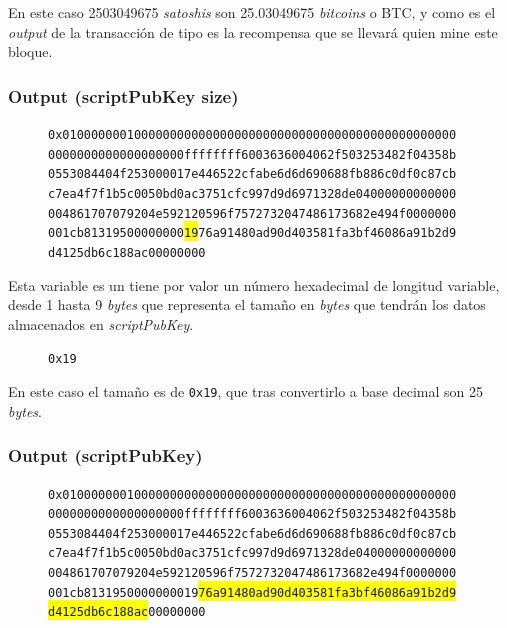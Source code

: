 \documentclass{article}
\begin{document}
    En este caso 2503049675 \textit{satoshis} son 25.03049675 \textit{bitcoins} o BTC, y como es el \textit{output} de la transacción de tipo  es la recompensa que se llevará quien mine este bloque.
    
    \subsubsection{Output (scriptPubKey size)}
    
    \begin{figure}[H]
        \texttt{0x0100000001000000000000000000000000000000000000000000000} \\
        \texttt{0000000000000000000ffffffff6003636004062f503253482f04358b} \\
        \texttt{0553084404f253000017e446522cfabe6d6d690688fb886c0df0c87cb} \\
        \texttt{c7ea4f7f1b5c0050bd0ac3751cfc997d9d6971328de04000000000000} \\
        \texttt{004861707079204e592120596f7572732047486173682e494f0000000} \\
        \texttt{001cb81319500000000\colorbox{Yellow}{19}76a91480ad90d403581fa3bf46086a91b2d9} \\
        \texttt{d4125db6c188ac00000000}
    \end{figure}
    
    Esta variable es un tiene por valor un número hexadecimal de longitud variable, desde 1 hasta 9 \textit{bytes} que representa el tamaño en \textit{bytes} que tendrán los datos almacenados en \textit{scriptPubKey}.
    \begin{figure}[H]
        \texttt{0x19}
    \end{figure}
    En este caso el tamaño es de \texttt{0x19}, que tras convertirlo a base decimal son 25 \textit{bytes}.
    
    \subsubsection{Output (scriptPubKey)}
    
    \begin{figure}[H]
        \texttt{0x0100000001000000000000000000000000000000000000000000000} \\
        \texttt{0000000000000000000ffffffff6003636004062f503253482f04358b} \\
        \texttt{0553084404f253000017e446522cfabe6d6d690688fb886c0df0c87cb} \\
        \texttt{c7ea4f7f1b5c0050bd0ac3751cfc997d9d6971328de04000000000000} \\
        \texttt{004861707079204e592120596f7572732047486173682e494f0000000} \\
        \texttt{001cb8131950000000019\colorbox{Yellow}{76a91480ad90d403581fa3bf46086a91b2d9}} \\
        \texttt{\colorbox{Yellow}{d4125db6c188ac}00000000}
    \end{figure}
    
\end{document}
